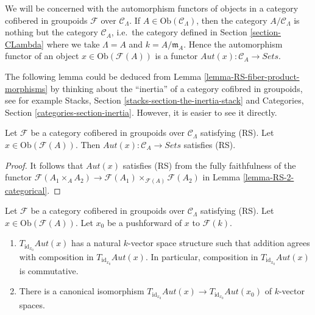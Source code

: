 \noindent 
We will be concerned with the automorphism functors of objects in a category
cofibered in groupoids $\mathcal{F}$ over $\mathcal{C}_\Lambda$. If
$A \in \text{Ob}(\mathcal{C}_\Lambda)$, then the category
$A/\mathcal{C}_\Lambda$ is nothing but the category $\mathcal{C}_A$,
i.e.\ the category defined in Section \ref{section-CLambda}
where we take $\Lambda = A$ and $k = A/\mathfrak m_A$.
Hence the automorphism functor of an object
$x \in \text{Ob}(\mathcal{F}(A))$ is a functor 
$\mathit{Aut}(x) : \mathcal{C}_A \to \textit{Sets}$.

\medskip\noindent
The following lemma could be deduced from
Lemma \ref{lemma-RS-fiber-product-morphisms}
by thinking about the ``inertia'' of a category cofibred in groupoids,
see for example
Stacks, Section \ref{stacks-section-the-inertia-stack}
and
Categories, Section \ref{categories-section-inertia}.
However, it is easier to see it directly.

\begin{lemma}
\label{lemma-Aut-functor-RS}
Let $\mathcal{F}$ be a category cofibered in groupoids over
$\mathcal{C}_\Lambda$ satisfying (RS). Let
$x \in \text{Ob}(\mathcal{F}(A))$. Then
$\mathit{Aut}(x): \mathcal{C}_{A} \to \textit{Sets}$ satisfies (RS).
\end{lemma}

\begin{proof}
It follows that $\mathit{Aut}(x)$ satisfies (RS) from the fully 
faithfulness of the functor
$\mathcal{F}(A_1 \times_A A_2) \to
\mathcal{F}(A_1) \times_{\mathcal{F}(A)} \mathcal{F}(A_2)$ in
Lemma \ref{lemma-RS-2-categorical}.
\end{proof}

\begin{lemma}
\label{lemma-Aut-functor-tangent-space}
Let $\mathcal{F}$ be a category cofibered in groupoids over
$\mathcal{C}_\Lambda$ satisfying (RS). Let
$x \in \text{Ob}(\mathcal{F}(A))$. Let $x_0$ be a pushforward of $x$ to
$\mathcal{F}(k)$.
\begin{enumerate}
\item $T_{\text{id}_{x_0}} \mathit{Aut}(x)$ has a natural $k$-vector 
space structure such that addition agrees with composition in 
$T_{\text{id}_{x_0}} \mathit{Aut}(x)$. In particular, composition in 
$T_{\text{id}_{x_0}} \mathit{Aut}(x)$ is commutative.
\item There is a canonical isomorphism 
$T_{\text{id}_{x_0}} \mathit{Aut}(x) \to
T_{\text{id}_{x_0}} \mathit{Aut}(x_0)$
of $k$-vector spaces.
\end{enumerate}
\end{lemma}

